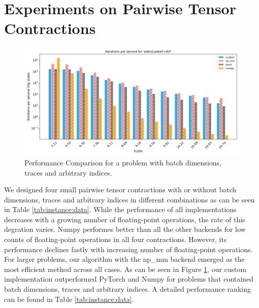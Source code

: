 \section{Experiments on Pairwise Tensor Contractions}
\begin{figure}[h]
    \centering
    \includegraphics[width=1\textwidth]{images/aabcd_adeef__dcf.png}  %
    \caption{Performance Comparison for a problem with batch dimensions, traces and arbitrary indices.}
    \label{flops}
\end{figure}
\noindent We designed four small pairwise tensor contractions with or without batch dimensions, traces and arbitrary indices in different combinations as can be seen in Table \ref{tab:instance:data}. While the performance of all implementations decreases with a growing number of floating-point operations, the rate of this degration varies. Numpy performes better than all the other backends for low counts of floating-point operations in all four contractions. However, its performance declines fastly with increasing number of floating-point operations. For larger problems, our algorithm with the np\_mm backend emerged as the most efficient method across all cases. As can be seen in Figure \ref{flops}, our custom implementation outperformed PyTorch and Numpy for problems that contained batch dimensions, traces and arbitrary indices. A detailed performance ranking can be found in Table \ref{tab:instance:data}.

